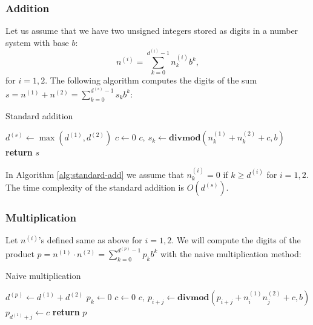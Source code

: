 \documentclass{article}
\newcommand*{\divmod}[2]{\mathbf{divmod}\left( #1, #2 \right)}
\begin{document}
\subsubsection{Addition}

Let us assume that we have two unsigned integers stored as digits in a number system with base $b$:
\[
    n^{(i)} = \sum_{k=0}^{d^{(i)}-1} n_k^{(i)} b^k,
\]
for $i=1,2$.
The following algorithm computes the digits of the sum $s = n^{(1)} + n^{(2)} = \sum_{k=0}^{d^{(s)}-1} s_k b^k$:
\begin{algorithm}
    \caption{Standard addition}
    \label{alg:standard-add}
    \begin{algorithmic}[1]
            \State $d^{(s)} \gets \max\left( d^{(1)}, d^{(2)} \right)$
            \State $c \gets 0$
                \State $c,\ s_k \gets \divmod{n_k^{(1)} + n_k^{(2)} + c}{b}$
            \EndFor
            \State \textbf{return} $s$
        \EndProcedure
    \end{algorithmic}
\end{algorithm}

In Algorithm \ref{alg:standard-add} we assume that $n^{(i)}_k = 0$ if $k \ge d^{(i)}$ for $i=1,2$.
The time complexity of the standard addition is $O\left(d^{(s)}\right)$.

\subsubsection{Multiplication}

Let $n^{(i)}$'s defined same as above for $i=1,2$.
We will compute the digits of the product $p=n^{(1)} \cdot n^{(2)} = \sum_{k=0}^{d^{(p)}-1} p_k b^k$ with the naive multiplication method:
\begin{algorithm}
    \caption{Naive multiplication}
    \label{alg:naive-mul}
    \begin{algorithmic}[1]
            \State $d^{(p)} \gets d^{(1)} + d^{(2)}$
                \State $p_k \gets 0$
            \EndFor
                \State $c \gets 0$
                    \State $c,\ p_{i+j} \gets \divmod{p_{i+j} + n^{(1)}_i n^{(2)}_j + c}{b}$
                \EndFor
            \State $p_{d^{(1)}+j} \gets c$
            \EndFor
            \State \textbf{return} $p$
        \EndProcedure
    \end{algorithmic}
\end{algorithm}
\end{document}
